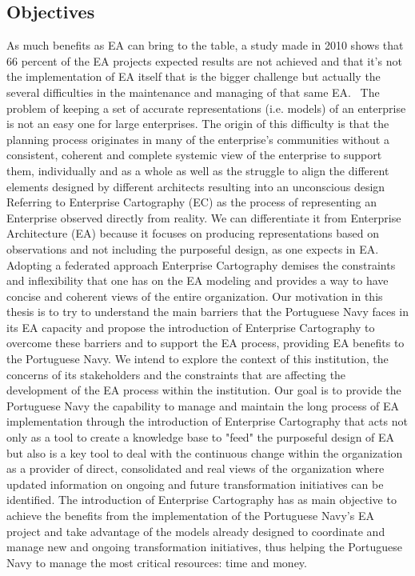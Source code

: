 \documentclass[runningheads]{llncs}
\begin{document}
\subsection{Objectives}
As much benefits as EA can bring to the table, a study made in 2010 shows that 66 percent of the EA projects expected results are not achieved and that it's not the implementation of EA itself that is the bigger challenge but actually the several difficulties in the maintenance and managing of that same EA.~\cite{ref_4}
The problem of keeping a set of accurate representations (i.e.  models) of an enterprise is not an easy one for large enterprises. The origin of this difficulty is that the planning process originates in many of the enterprise’s communities without a consistent, coherent and complete systemic view of the enterprise to support them, individually and as a whole as well as the struggle to align the different elements designed by different architects resulting into an unconscious design~\cite{ref_5}
Referring to Enterprise Cartography (EC) as the process of representing an Enterprise observed directly from reality. We can differentiate it from Enterprise Architecture (EA) because it focuses on producing representations based on observations and not including the purposeful design, as one expects in EA.~\cite{ref_5}  Adopting a federated approach Enterprise Cartography demises the constraints and inflexibility that one has on the EA modeling and provides a way to have concise and coherent views of the entire organization.
Our motivation in this thesis is to try to understand the main barriers that the Portuguese Navy faces in its EA capacity and propose the introduction of Enterprise Cartography to overcome these barriers and to support the EA process, providing EA benefits to the Portuguese Navy.
We intend to explore the context of this institution, the concerns of its stakeholders and the constraints that are affecting the development of the EA process within the institution. Our goal is to provide the Portuguese Navy the capability to manage and maintain the long process of EA implementation through the introduction of Enterprise Cartography that acts not only as a tool to create a knowledge base to "feed" the purposeful design of EA but also is a key tool to deal with the continuous change within the organization as a provider of direct, consolidated and real views of the organization where updated information on ongoing and future transformation initiatives can be identified. The introduction of Enterprise Cartography has as main objective to achieve the benefits from the implementation of the Portuguese Navy's EA project and take advantage of the models already designed to coordinate and manage new and ongoing transformation initiatives, thus helping the Portuguese Navy to manage the most critical resources: time and money.
\end{document}
